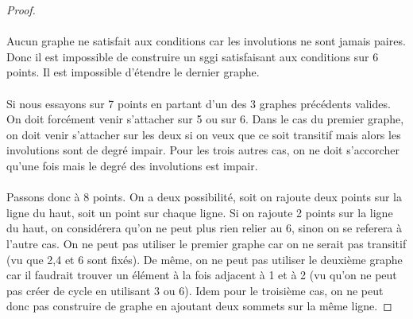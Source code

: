 \documentclass[a4paper]{article}
\theoremstyle{mytheorem}
\begin{document}
\begin{proof}
\begin{center}
  \end{center}

  \paragraph{}
  Aucun graphe ne satisfait aux conditions car les involutions ne sont jamais paires. Donc il est impossible de construire un sggi satisfaisant aux conditions sur 6 points. Il est impossible d'étendre le dernier graphe.

  \paragraph{}
  Si nous essayons sur 7 points en partant d'un des 3 graphes précédents valides. On doit forcément venir s'attacher sur 5 ou sur 6. Dans le cas du premier graphe, on doit venir s'attacher sur les deux si on veux que ce soit transitif mais alors les involutions sont de degré impair. Pour les trois autres cas, on ne doit s'accorcher qu'une fois mais le degré des involutions est impair.

  \paragraph{}
  Passons donc à 8 points. On a deux possibilité, soit on rajoute deux points sur la ligne du haut, soit un point sur chaque ligne. Si on rajoute 2 points sur la ligne du haut, on considérera qu'on ne peut plus rien relier au 6, sinon on se referera à l'autre cas. On ne peut pas utiliser le premier graphe car on ne serait pas transitif (vu que 2,4 et 6 sont fixés). De même, on ne peut pas utiliser le deuxième graphe car il faudrait trouver un élément à la fois adjacent à 1 et à 2 (vu qu'on ne peut pas créer de cycle en utilisant 3 ou 6). Idem pour le troisième cas, on ne peut donc pas construire de graphe en ajoutant deux sommets sur la même ligne.


\end{proof}
\end{document}
